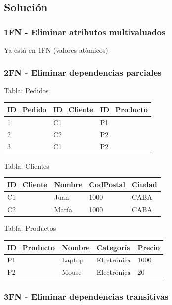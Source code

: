 \documentclass[12pt]{article}
\begin{document}
\subsection{Solución}

\subsubsection{1FN - Eliminar atributos multivaluados}
Ya está en 1FN (valores atómicos)

\subsubsection{2FN - Eliminar dependencias parciales}

Tabla: Pedidos
\begin{center}
\begin{tabular}{lll}
\toprule
ID\_Pedido & ID\_Cliente & ID\_Producto \\
\midrule
1 & C1 & P1 \\
2 & C2 & P2 \\
3 & C1 & P2 \\
\bottomrule
\end{tabular}
\end{center}

Tabla: Clientes
\begin{center}
\begin{tabular}{llll}
\toprule
ID\_Cliente & Nombre & CodPostal & Ciudad \\
\midrule
C1 & Juan & 1000 & CABA \\
C2 & María & 1000 & CABA \\
\bottomrule
\end{tabular}
\end{center}

Tabla: Productos
\begin{center}
\begin{tabular}{llll}
\toprule
ID\_Producto & Nombre & Categoría & Precio \\
\midrule
P1 & Laptop & Electrónica & 1000 \\
P2 & Mouse & Electrónica & 20 \\
\bottomrule
\end{tabular}
\end{center}

\subsubsection{3FN - Eliminar dependencias transitivas}
\end{document}
